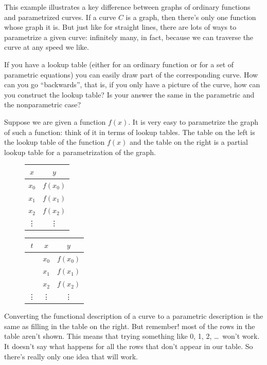 \documentclass[justified]{tufte-handout}
\begin{document}
This example illustrates a key difference between graphs of ordinary functions and parametrized curves. If a curve $C$ is a graph, then there's only one function whose graph it is. But just like for straight lines, there are lots of ways to parametrize a given curve: infinitely many, in fact, because we can traverse the curve at any speed we like. 

\begin{marginnote}
	If you have a lookup table (either for an ordinary function or for a set of parametric equations) you can easily draw part of the corresponding curve. How can you go ``backwards'', that is, if you only have a picture of the curve, how can you construct the lookup table? Is your answer the same in the parametric and the nonparametric case?
\end{marginnote}

Suppose we are given a function $f(x)$. It is very easy to parametrize the graph of such a function: think of it in terms of lookup tables. The table on the left is the lookup table of the function $f(x)$ and the table on the right is a partial lookup table for a parametrization of the graph.
\begin{figure}[ht]
\begin{minipage}[b]{0.45\linewidth}
\centering
\begin{tabular}{c|c}
	$x$ & $y$ \\ \hline
	$x_0$ & $f(x_0)$ \\
	$x_1$ & $f(x_1)$ \\
	$x_2$ & $f(x_2)$ \\
	\vdots & \vdots
\end{tabular}
\end{minipage}
\hspace{0.5cm}
\begin{minipage}[b]{0.45\linewidth}
\centering
\begin{tabular}{c||c|c}
	$t$ & $x$  & $y$ \\ \hline
	  & $x_0$ & $f(x_0)$ \\
	  & $x_1$ & $f(x_1)$ \\
	  & $x_2$ & $f(x_2)$ \\
	\vdots & \vdots & \vdots
\end{tabular}
\end{minipage}
\end{figure}
Converting the functional description of a curve to a parametric description is the same as filling in the table on the right. But remember! most of the rows in the table aren't shown. This means that trying something like 0, 1, 2, \dots\ won't work. It doesn't say what happens for all the rows that don't appear in our table. So there's really only one idea that will work.
\end{document}
